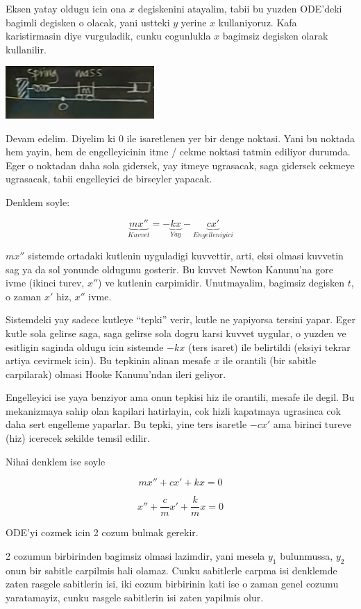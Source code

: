 \documentclass[12pt,fleqn]{article}\usepackage{../common}
\begin{document}
Eksen yatay oldugu icin ona $x$ degiskenini atayalim, tabii bu yuzden
ODE'deki bagimli degisken o olacak, yani ustteki $y$ yerine $x$
kullaniyoruz. Kafa karistirmasin diye vurguladik, cunku cogunlukla $x$ bagimsiz
degisken olarak kullanilir. 

\includegraphics[height=2cm]{9_2.png}

Devam edelim. Diyelim ki 0 ile isaretlenen yer bir denge noktasi. Yani bu
noktada hem yayin, hem de engelleyicinin itme / cekme noktasi tatmin
ediliyor durumda. Eger o noktadan daha sola gidersek, yay itmeye ugrasacak,
saga gidersek cekmeye ugrasacak, tabii engelleyici de birseyler yapacak. 

Denklem soyle: 

\[ \underbrace{mx''}_{Kuvvet} =
- \underbrace{kx}_{Yay} 
- \underbrace{cx'}_{Engelleniyici}
\]

$mx''$ sistemde ortadaki kutlenin uyguladigi kuvvettir, arti, eksi olmasi
kuvvetin sag ya da sol yonunde oldugunu gosterir. Bu kuvvet Newton Kanunu'na
gore ivme (ikinci turev, $x''$) ve kutlenin carpimidir. Unutmayalim,
bagimsiz degisken $t$, o zaman $x'$ hiz, $x''$ ivme.

Sistemdeki yay sadece kutleye ``tepki'' verir, kutle ne yapiyorsa tersini
yapar. Eger kutle sola gelirse saga, saga gelirse sola dogru karsi kuvvet
uygular, o yuzden ve esitligin saginda oldugu icin sistemde $-kx$ (ters
isaret) ile belirtildi (eksiyi tekrar artiya cevirmek icin). Bu tepkinin
alinan mesafe $x$ ile orantili (bir sabitle carpilarak) olmasi Hooke
Kanunu'ndan ileri geliyor.

Engelleyici ise yaya benziyor ama onun tepkisi hiz ile orantili, mesafe ile
degil. Bu mekanizmaya sahip olan kapilari hatirlayin, cok hizli kapatmaya
ugrasinca cok daha sert engelleme yaparlar. Bu tepki, yine ters isaretle
$-cx'$ ama birinci tureve (hiz) icerecek sekilde temsil edilir.

Nihai denklem ise soyle

\[ mx'' + cx' + kx = 0 \]

\[ x'' + \frac{c}{m}x' + \frac{k}{m}x = 0 \]

ODE'yi cozmek icin 2 cozum bulmak gerekir. 

2 cozumun birbirinden bagimsiz olmasi lazimdir, yani mesela $y_1$
bulunmussa, $y_2$ onun bir sabitle carpilmis hali olamaz. Cunku sabitlerle
carpma isi denklemde zaten rasgele sabitlerin isi, iki cozum birbirinin
kati ise o zaman genel cozumu yaratamayiz, cunku rasgele sabitlerin isi
zaten yapilmis olur.
\end{document}
